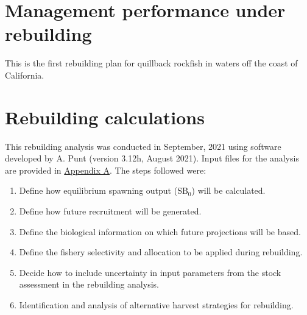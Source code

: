 \documentclass[11pt,
  english,
  a4paper,
]{article}
\begin{document}

\hypertarget{management-performance-under-rebuilding}{%
\section{Management performance under rebuilding}\label{management-performance-under-rebuilding}}

\leavevmode\tagmcend\tagstructend


This is the first rebuilding plan for quillback rockfish in waters off the coast of California.

\leavevmode\tagmcend\tagstructend\par


\hypertarget{rebuilding-calculations}{%
\section{Rebuilding calculations}\label{rebuilding-calculations}}

\leavevmode\tagmcend\tagstructend


This rebuilding analysis was conducted in September, 2021 using software developed by A. Punt (version 3.12h, August 2021). Input files for the analysis are provided in {\protect\hyperlink{append_a}{Appendix A}\leavevmode\tagmcend\tagstructend}. The steps followed were:

\leavevmode\tagmcend\tagstructend\par

\begin{enumerate}
    \item Define how equilibrium spawning output ($\text{SB}_0$) will be calculated. 
    \item Define how future recruitment will be generated.
    \item Define the biological information on which future projections will be based.
    \item Define the fishery selectivity and allocation to be applied during rebuilding. 
    \item Decide how to include uncertainty in input parameters from the stock assessment in the rebuilding analysis. 
    \item Identification and analysis of alternative harvest strategies for rebuilding. 
\end{enumerate}
\end{document}
